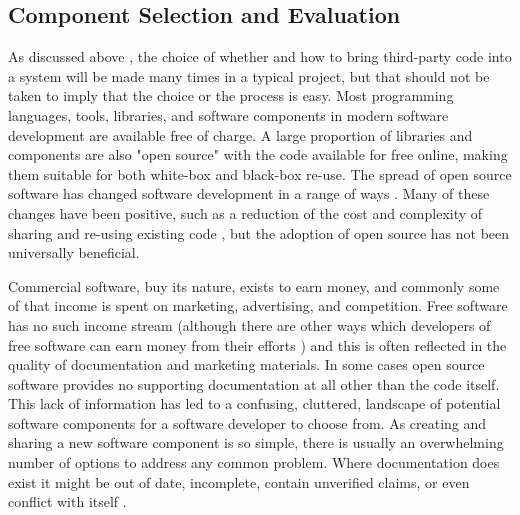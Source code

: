\subsection{Component Selection and Evaluation}

As discussed above , the choice of whether and how to bring third-party code into a system will be made many times in a typical project, but that should not be taken to imply that the choice or the process is easy. Most programming  languages, tools, libraries, and software components in modern software development are available free of charge. A large proportion of libraries and components are also "open source"  with the code available for free online, making them suitable for both white-box and black-box re-use. The spread of open source software has changed software development in a range of ways . Many of these changes have been positive, such as a reduction of the cost and complexity of sharing and re-using existing code , but the adoption of open source has not been universally beneficial.

Commercial software, buy its nature, exists to earn money, and commonly some of that income is spent on marketing, advertising, and competition. Free software has no such income stream (although there are other ways which developers of free software can earn money from their efforts ) and this is often reflected in the quality of documentation and marketing materials. In some cases open source software provides no supporting documentation at all other than the code itself. This lack of information has led to a confusing, cluttered, landscape of potential software components for a software developer to choose from. As creating and sharing a new software component is so simple, there is usually an overwhelming number of options to address any common problem. Where documentation does exist it might be out of date, incomplete, contain unverified claims, or even conflict with itself .

